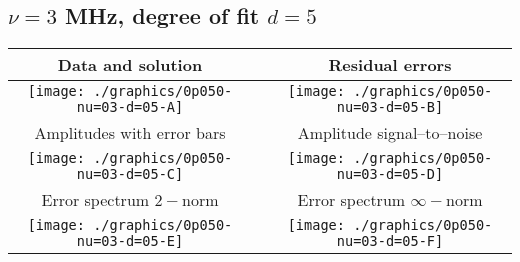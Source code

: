 

% 

\clearpage{}
\break{}

\subsection{$\nu = 3$ MHz, degree of fit $d = 5$}

\begin{table}[h]
    \begin{center}
        \begin{tabular}{ccc}
            Data and solution & \quad & Residual errors \\\hline
            \texttt{[image: ./graphics/0p050-nu=03-d=05-A]} &&
            \texttt{[image: ./graphics/0p050-nu=03-d=05-B]} \\[15pt]
            Amplitudes with error bars && Amplitude signal--to--noise \\\hline
            \texttt{[image: ./graphics/0p050-nu=03-d=05-C]} &&
            \texttt{[image: ./graphics/0p050-nu=03-d=05-D]} \\[15pt]
            Error spectrum $2-$norm && Error spectrum $\infty-$norm \\\hline
            \texttt{[image: ./graphics/0p050-nu=03-d=05-E]} &&
            \texttt{[image: ./graphics/0p050-nu=03-d=05-F]} \\[15pt]
        \end{tabular}
    \end{center}
\label{fig:elev=50, nu=3}
\end{table}



\endinput
